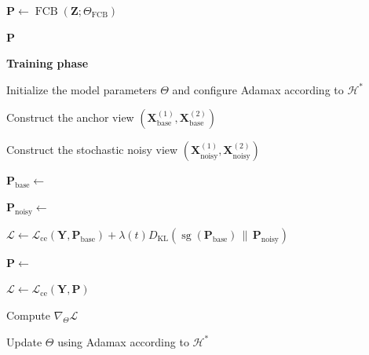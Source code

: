 \documentclass[a4paper]{cas-sc}
\begin{document}
\begin{algorithm}[!htbp]
\begin{algorithmic}[1]
    \State $\mathbf{P}
    \gets
    \operatorname{FCB}
    (\mathbf{Z};\Theta_{\mathrm{FCB}})$

    \State \Return $\mathbf{P}$

\EndProcedure

\Statex
\Statex \textbf{Training phase}

\State Initialize the model parameters $\Theta$ and configure
Adamax according to $\mathcal{H}^{\ast}$




            \State Construct the anchor view
            $(\mathbf{X}_{\mathrm{base}}^{(1)},
            \mathbf{X}_{\mathrm{base}}^{(2)})$

            \State Construct the stochastic noisy view
            $(\mathbf{X}_{\mathrm{noisy}}^{(1)},
            \mathbf{X}_{\mathrm{noisy}}^{(2)})$

            \State $\mathbf{P}_{\mathrm{base}}
            \gets$

            \State $\mathbf{P}_{\mathrm{noisy}}
            \gets$

            \State $\mathcal{L}
            \gets
            \mathcal{L}_{\mathrm{ce}}
            (\mathbf{Y},\mathbf{P}_{\mathrm{base}})
            +
            \lambda(t)
            D_{\mathrm{KL}}\!\left(
            \operatorname{sg}(\mathbf{P}_{\mathrm{base}})
            \,\|\,\mathbf{P}_{\mathrm{noisy}}
            \right)$

        \Else

            \State $\mathbf{P}
            \gets$

            \State $\mathcal{L}
            \gets
            \mathcal{L}_{\mathrm{ce}}
            (\mathbf{Y},\mathbf{P})$

        \EndIf

        \State Compute $\nabla_{\Theta}\mathcal{L}$

        \State Update $\Theta$ using Adamax according to
        $\mathcal{H}^{\ast}$


\end{algorithmic}
\end{algorithm}
\end{document}

